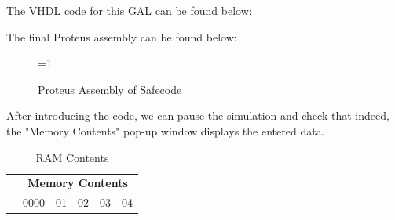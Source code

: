 \clearpage

The VHDL code for this GAL can be found below:


The final Proteus assembly can be found below:

\begin{figure}[H]
    \centering
 
    \ifnum\value{ANIMATION}=1 {
    } 
    \fi
    
    \caption{Proteus Assembly of Safecode}
    \label{fig:PROTEUS_SAFECODE_ASSEMBLY_FINAL}
\end{figure}
            
After introducing the code, we can pause the simulation and check that indeed, the "Memory Contents" pop-up window displays the entered data.\medskip

\begin{table}[H]
    \centering
        \begin{tabular}[t]{lccccc}
            \toprule
                &\multicolumn{5}{c}{\textbf{Memory Contents}}\\
                & 0000 & 01 & 02 & 03 & 04 \\
            \bottomrule
        \end{tabular}
        \caption{RAM Contents}
        \label{table:RAM_CONTENTS}
\end{table}

\clearpage
















